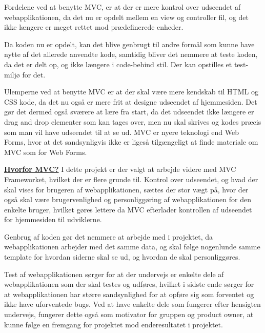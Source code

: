 \noindent Fordelene ved at benytte MVC, er at der er mere kontrol over udseendet af webapplikationen, da det nu er opdelt mellem en view og controller fil, og det ikke længere er meget rettet mod prædefinerede enheder. \newline 

\noindent Da koden nu er opdelt, kan det blive genbrugt til andre formål som kunne have nytte af det allerede anvendte kode, samtidig bliver det nemmere at teste koden, da det er delt op, og ikke længere i code-behind stil. Der kan opstilles et test-miljø for det. \newline 

\noindent Ulemperne ved at benytte MVC er at der skal være mere kendskab til HTML og CSS kode, da det nu også er mere frit at designe udseendet af hjemmesiden. Det gør det dermed også sværere at lære fra start, da det udseendet ikke længere er drag and drop elementer som kan tages over, men nu skal skrives og kodes præcis som man vil have udseendet til at se ud. \newline
\noindent MVC er nyere teknologi end Web Forms, hvor at det sandsynligvis ikke er ligeså tilgængeligt at finde materiale om MVC som for Web Forms.\newline

\noindent \textbf{\underline{Hvorfor MVC?}}\newline
\noindent I dette projekt er der valgt at arbejde videre med MVC Frameworket, hvilket der er flere grunde til.\newline
\noindent Kontrol over udseendet, og hvad der skal vises for brugeren af webapplikationen, sættes der stor vægt på, hvor der også skal være brugervenlighed og personliggøring af webapplikationen for den enkelte bruger, hvilket gøres lettere da MVC efterlader kontrollen af udseendet for hjemmesiden til udviklerne.\newline

\noindent Genbrug af koden gør det nemmere at arbejde med i projektet, da webapplikationen arbejder med det samme data, og skal følge nogenlunde samme template for hvordan siderne skal se ud, og hvordan de skal personliggøres. \newline 

\noindent Test af webapplikationen sørger for at der undervejs er enkelte dele af webapplikationen som der skal testes og udføres, hvilket i sidste ende sørger for at webapplikationen har større sandsynlighed for at opføre sig som forventet og ikke have uforventede bugs. Ved at have enkelte dele som fungerer efter hensigten undervejs, fungerer dette også som motivator for gruppen og product owner, at kunne følge en fremgang for projektet mod enderesultatet i projektet.\newline

